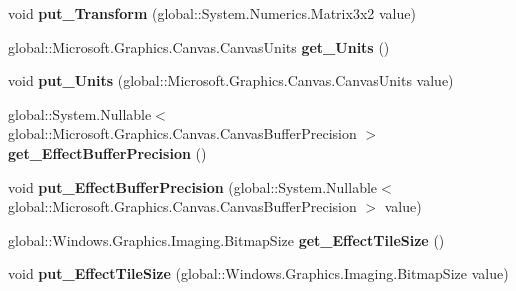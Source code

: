 \begin{DoxyCompactItemize}
void {\bfseries put\+\_\+\+Transform} (global\+::\+System.\+Numerics.\+Matrix3x2 value)
\item 
\mbox{\label{class_microsoft_1_1_graphics_1_1_canvas_1_1_canvas_drawing_session_a119604ae2b5fd9e7f79d46ddd93313d2}} 
global\+::\+Microsoft.\+Graphics.\+Canvas.\+Canvas\+Units {\bfseries get\+\_\+\+Units} ()
\item 
\mbox{\label{class_microsoft_1_1_graphics_1_1_canvas_1_1_canvas_drawing_session_aaa91afaef20786d41f0eb866b8b765dc}} 
void {\bfseries put\+\_\+\+Units} (global\+::\+Microsoft.\+Graphics.\+Canvas.\+Canvas\+Units value)
\item 
\mbox{\label{class_microsoft_1_1_graphics_1_1_canvas_1_1_canvas_drawing_session_a1078ad1f0fd9c95f4515e93a900a2545}} 
global\+::\+System.\+Nullable$<$ global\+::\+Microsoft.\+Graphics.\+Canvas.\+Canvas\+Buffer\+Precision $>$ {\bfseries get\+\_\+\+Effect\+Buffer\+Precision} ()
\item 
\mbox{\label{class_microsoft_1_1_graphics_1_1_canvas_1_1_canvas_drawing_session_a55b04c88b87788ac26038414a232e600}} 
void {\bfseries put\+\_\+\+Effect\+Buffer\+Precision} (global\+::\+System.\+Nullable$<$ global\+::\+Microsoft.\+Graphics.\+Canvas.\+Canvas\+Buffer\+Precision $>$ value)
\item 
\mbox{\label{class_microsoft_1_1_graphics_1_1_canvas_1_1_canvas_drawing_session_ab0590c3420906f6653193441dacb0930}} 
global\+::\+Windows.\+Graphics.\+Imaging.\+Bitmap\+Size {\bfseries get\+\_\+\+Effect\+Tile\+Size} ()
\item 
\mbox{\label{class_microsoft_1_1_graphics_1_1_canvas_1_1_canvas_drawing_session_a1117e02a854af2c00904eea362dfe10f}} 
void {\bfseries put\+\_\+\+Effect\+Tile\+Size} (global\+::\+Windows.\+Graphics.\+Imaging.\+Bitmap\+Size value)
\item 
\mbox{\label{class_microsoft_1_1_graphics_1_1_canvas_1_1_canvas_drawing_session_acdb06f146f507d5ed91c5780afe92052}} 

\end{DoxyCompactItemize}

